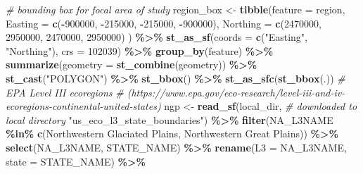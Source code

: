 \documentclass[
]{article}
\newenvironment{Shaded}{\begin{snugshade}}{\end{snugshade}}
\newcommand{\AttributeTok}[1]{\textcolor[rgb]{0.13,0.29,0.53}{#1}}
\newcommand{\CommentTok}[1]{\textcolor[rgb]{0.56,0.35,0.01}{\textit{#1}}}
\newcommand{\DecValTok}[1]{\textcolor[rgb]{0.00,0.00,0.81}{#1}}
\newcommand{\FunctionTok}[1]{\textcolor[rgb]{0.13,0.29,0.53}{\textbf{#1}}}
\newcommand{\NormalTok}[1]{#1}
\newcommand{\OtherTok}[1]{\textcolor[rgb]{0.56,0.35,0.01}{#1}}
\newcommand{\SpecialCharTok}[1]{\textcolor[rgb]{0.81,0.36,0.00}{\textbf{#1}}}
\newcommand{\StringTok}[1]{\textcolor[rgb]{0.31,0.60,0.02}{#1}}
\begin{document}
\begin{Shaded}
\begin{Highlighting}[]
\CommentTok{\# bounding box for focal area of study}
\NormalTok{  region\_box }\OtherTok{\textless{}{-}} 
    \FunctionTok{tibble}\NormalTok{(}\AttributeTok{feature =} \StringTok{\textquotesingle{}region\textquotesingle{}}\NormalTok{, }
           \AttributeTok{Easting =} \FunctionTok{c}\NormalTok{(}\SpecialCharTok{{-}}\DecValTok{900000}\NormalTok{, }\SpecialCharTok{{-}}\DecValTok{215000}\NormalTok{, }\SpecialCharTok{{-}}\DecValTok{215000}\NormalTok{, }\SpecialCharTok{{-}}\DecValTok{900000}\NormalTok{), }
           \AttributeTok{Northing =} \FunctionTok{c}\NormalTok{(}\DecValTok{2470000}\NormalTok{, }\DecValTok{2950000}\NormalTok{, }\DecValTok{2470000}\NormalTok{, }\DecValTok{2950000}\NormalTok{) ) }\SpecialCharTok{\%\textgreater{}\%}
    \FunctionTok{st\_as\_sf}\NormalTok{(}\AttributeTok{coords =} \FunctionTok{c}\NormalTok{(}\StringTok{"Easting"}\NormalTok{, }\StringTok{"Northing"}\NormalTok{), }\AttributeTok{crs =} \DecValTok{102039}\NormalTok{) }\SpecialCharTok{\%\textgreater{}\%}
    \FunctionTok{group\_by}\NormalTok{(feature) }\SpecialCharTok{\%\textgreater{}\%}
    \FunctionTok{summarize}\NormalTok{(}\AttributeTok{geometry =} \FunctionTok{st\_combine}\NormalTok{(geometry)) }\SpecialCharTok{\%\textgreater{}\%}
    \FunctionTok{st\_cast}\NormalTok{(}\StringTok{"POLYGON"}\NormalTok{) }\SpecialCharTok{\%\textgreater{}\%}
    \FunctionTok{st\_bbox}\NormalTok{() }\SpecialCharTok{\%\textgreater{}\%}
    \FunctionTok{st\_as\_sfc}\NormalTok{(}\FunctionTok{st\_bbox}\NormalTok{(.))}
\CommentTok{\# EPA Level III ecoregions}
\CommentTok{\# (https://www.epa.gov/eco{-}research/level{-}iii{-}and{-}iv{-}ecoregions{-}continental{-}united{-}states)}
\NormalTok{  ngp }\OtherTok{\textless{}{-}} 
    \FunctionTok{read\_sf}\NormalTok{(local\_dir, }\CommentTok{\# downloaded to local directory}
            \StringTok{"us\_eco\_l3\_state\_boundaries"}\NormalTok{) }\SpecialCharTok{\%\textgreater{}\%}
      \FunctionTok{filter}\NormalTok{(NA\_L3NAME }\SpecialCharTok{\%in\%} \FunctionTok{c}\NormalTok{(}\StringTok{\textquotesingle{}Northwestern Glaciated Plains\textquotesingle{}}\NormalTok{, }
                              \StringTok{\textquotesingle{}Northwestern Great Plains\textquotesingle{}}\NormalTok{)) }\SpecialCharTok{\%\textgreater{}\%}
      \FunctionTok{select}\NormalTok{(NA\_L3NAME, STATE\_NAME) }\SpecialCharTok{\%\textgreater{}\%}
      \FunctionTok{rename}\NormalTok{(}\AttributeTok{L3 =}\NormalTok{ NA\_L3NAME, }\AttributeTok{state =}\NormalTok{ STATE\_NAME) }\SpecialCharTok{\%\textgreater{}\%}

\end{Highlighting}
\end{Shaded}
\end{document}
